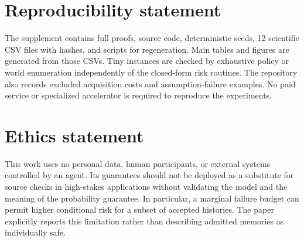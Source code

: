 \documentclass{article}
\newcommand{\1}{\mathbf 1}
\begin{document}
\section*{Reproducibility statement}
The supplement contains full proofs, source code, deterministic seeds, 12 scientific CSV files with hashes, and scripts for regeneration. Main tables and figures are generated from those CSVs. Tiny instances are checked by exhaustive policy or world enumeration independently of the closed-form risk routines. The repository also records excluded acquisition costs and assumption-failure examples. No paid service or specialized accelerator is required to reproduce the experiments.

\section*{Ethics statement}
This work uses no personal data, human participants, or external systems controlled by an agent. Its guarantees should not be deployed as a substitute for source checks in high-stakes applications without validating the model and the meaning of the probability guarantee. In particular, a marginal failure budget can permit higher conditional risk for a subset of accepted histories. The paper explicitly reports this limitation rather than describing admitted memories as individually safe.


\clearpage
\appendix

\end{document}
